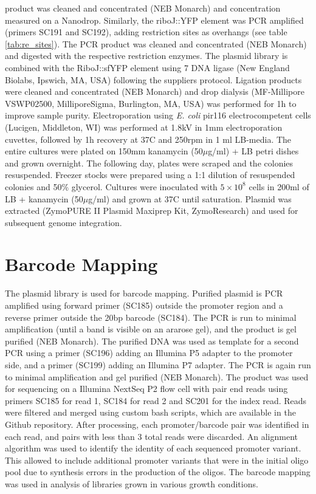 product was cleaned and concentrated (NEB Monarch) and concentration measured on a Nanodrop. Similarly, the riboJ::YFP element was PCR amplified (primers SC191 and SC192), adding restriction sites as overhangs (see table \ref{tab:re_sites}). The PCR product was cleaned and concentrated (NEB Monarch) and digested with the respective restriction enzymes. The plasmid library is combined with the RiboJ::sfYFP element using 7 DNA ligase (New England Biolabs, Ipswich, MA, USA) following the suppliers protocol. Ligation products were cleaned and concentrated (NEB Monarch) and drop dialysis (MF-Millipore VSWP02500, MilliporeSigma, Burlington, MA, USA)  was performed for 1h to improve sample purity. Electroporation using \textit{E. coli} pir116 electrocompetent cells (Lucigen, Middleton, WI) was performed at 1.8kV in 1mm electroporation cuvettes, followed by 1h recovery at 37C and 250rpm in 1 ml LB-media. The entire cultures were plated on 150mm kanamycin (50$\mu$g/ml) + LB petri dishes and grown overnight. The following day, plates were scraped and the colonies resuspended. Freezer stocks were prepared using a 1:1 dilution of resuspended colonies and 50\% glycerol. Cultures were inoculated with $5\times 10^8$ cells in 200ml of LB + kanamycin (50$\mu$g/ml) and grown at 37C until saturation. Plasmid was extracted (ZymoPURE II Plasmid Maxiprep Kit, ZymoResearch) and used for subsequent genome integration. 


\section{Barcode Mapping}
\label{sec:barcode_mapping}
The plasmid library is used for barcode mapping. Purified plasmid is PCR amplified using forward primer (SC185) outside the promoter region and a reverse primer outside the 20bp barcode (SC184). The PCR is run to minimal amplification (until a band is visible on an ararose gel), and the product is gel purified (NEB Monarch). The purified DNA was used as template for a second PCR using a primer (SC196) adding an Illumina P5 adapter to the promoter side, and a primer (SC199) adding an Illumina P7 adapter. The PCR is again run to minimal amplification and gel purified (NEB Monarch). The product was used for sequencing on a Illumina NextSeq P2 flow cell with pair end reads using primers SC185 for read 1, SC184 for read 2 and SC201 for the index read. Reads were filtered and merged using custom bash scripts, which are available in the Github repository. After processing, each promoter/barcode pair was identified in each read, and pairs with less than 3 total reads were discarded. An alignment algorithm was used to identify the identity of each sequenced promoter variant. This allowed to include additional promoter variants that were in the initial oligo pool due to synthesis errors in the production of the oligos. The barcode mapping was used in analysis of libraries grown in various growth conditions. 

